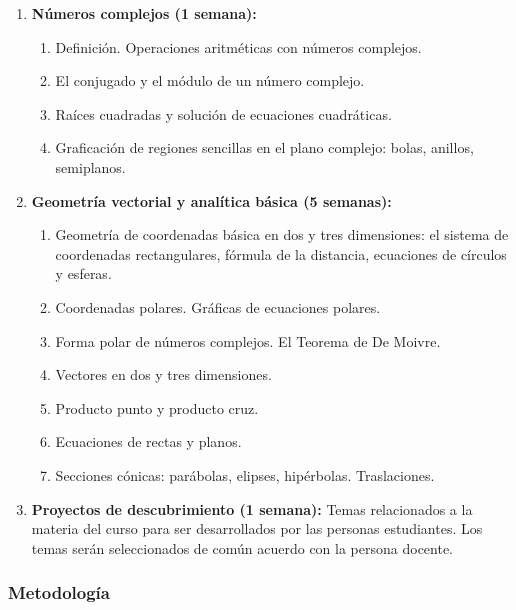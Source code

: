 \begin{refsection}
\begin{enumerate}
\item \textbf{Números complejos (1 semana):} 
\begin{enumerate}
    \item Definición. Operaciones aritméticas con números complejos.
    \item El conjugado y el módulo de un número complejo.
    \item Raíces cuadradas y solución de ecuaciones cuadráticas.
    \item Graficación de regiones sencillas en el plano complejo: bolas, anillos, semiplanos.
\end{enumerate}

\item \textbf{Geometría vectorial y analítica básica (5 semanas):} 
\begin{enumerate}
    \item Geometría de coordenadas básica en dos y tres dimensiones: el sistema de coordenadas rectangulares, fórmula de la distancia, ecuaciones de círculos y esferas.
    \item Coordenadas polares. Gráficas de ecuaciones polares. 
    \item Forma polar de números complejos. El Teorema de De Moivre.
    \item Vectores en dos y tres dimensiones.
    \item Producto punto y producto cruz.
    \item Ecuaciones de rectas y planos.
    \item Secciones cónicas: parábolas, elipses, hipérbolas. Traslaciones.
\end{enumerate}

\item \textbf{Proyectos de descubrimiento (1 semana):} 
Temas relacionados a la materia del curso para ser desarrollados por las personas estudiantes. Los temas serán seleccionados de común acuerdo con la persona docente. 

\end{enumerate}
\subsubsection*{Metodología}


\end{refsection}
